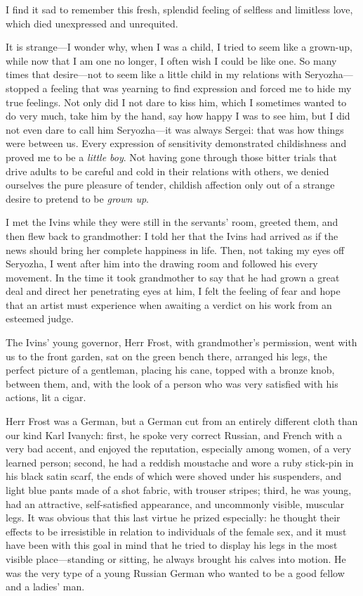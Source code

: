 I find it sad to remember this fresh, splendid feeling of selfless and limitless love, which died unexpressed and unrequited.

It is strange---I wonder why, when I was a child, I tried to seem like a grown-up, while now that I am one no longer, I often wish I could be like one. So many times that desire---not to seem like a little child in my relations with Seryozha---stopped a feeling that was yearning to find expression and forced me to hide my true feelings. Not only did I not dare to kiss him, which I sometimes wanted to do very much, take him by the hand, say how happy I was to see him, but I did not even dare to call him Seryozha---it was always Sergei: that was how things were between us. Every expression of sensitivity demonstrated childishness and proved me to be a \emph{little boy}. Not having gone through those bitter trials that drive adults to be careful and cold in their relations with others, we denied ourselves the pure pleasure of tender, childish affection only out of a strange desire to pretend to be \emph{grown up}.

I met the Ivins while they were still in the servants' room, greeted them, and then flew back to grandmother: I told her that the Ivins had arrived as if the news should bring her complete happiness in life. Then, not taking my eyes off Seryozha, I went after him into the drawing room and followed his every movement. In the time it took grandmother to say that he had grown a great deal and direct her penetrating eyes at him, I felt the feeling of fear and hope that an artist must experience when awaiting a verdict on his work from an esteemed judge.

The Ivins' young governor, Herr Frost, with grandmother's permission, went with us to the front garden, sat on the green bench there, arranged his legs, the perfect picture of a gentleman, placing his cane, topped with a bronze knob, between them, and, with the look of a person who was very satisfied with his actions, lit a cigar.

Herr Frost was a German, but a German cut from an entirely different cloth than our kind Karl Ivanych: first, he spoke very correct Russian, and French with a very bad accent, and enjoyed the reputation, especially among women, of a very learned person; second, he had a reddish moustache and wore a ruby stick-pin in his black satin scarf, the ends of which were shoved under his suspenders, and light blue pants made of a shot fabric, with trouser stripes; third, he was young, had an attractive, self-satisfied appearance, and uncommonly visible, muscular legs. It was obvious that this last virtue he prized especially: he thought their effects to be irresistible in relation to individuals of the female sex, and it must have been with this goal in mind that he tried to display his legs in the most visible place---standing or sitting, he always brought his calves into motion. He was the very type of a young Russian German who wanted to be a good fellow and a ladies' man.

